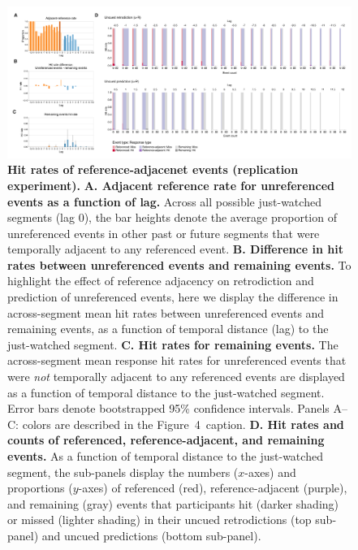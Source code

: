 \documentclass[10pt]{article}
\newcommand{\resultTwo}{4}
\begin{document}
\begin{figure}[tp]
    \centering
    \includegraphics[width=\textwidth]{results4_rep_ori}
      
        \caption{\textbf{Hit rates of reference-adjacenet events (replication experiment).} \textbf{A. Adjacent reference rate for unreferenced events as a function of lag.} Across all possible just-watched segments (lag 0), the bar heights denote the average proportion of unreferenced events in other past or future segments that were temporally adjacent to any referenced event. \textbf{B. Difference in hit rates between unreferenced events and remaining events.} To highlight the effect of reference adjacency on retrodiction and prediction of unreferenced events, here we display the difference in across-segment mean hit rates between unreferenced events and remaining events, as a function of temporal distance (lag) to the just-watched segment. \textbf{C. Hit rates for remaining events.} The across-segment mean response hit rates for unreferenced events that were \textit{not} temporally adjacent to any referenced events are displayed as a function of temporal distance to the just-watched segment. Error bars denote bootstrapped 95\% confidence intervals. Panels A--C: colors are described in the Figure~\resultTwo~caption. \textbf{D. Hit rates and counts of referenced, reference-adjacent, and remaining events.} As a function of temporal distance to the just-watched segment, the sub-panels display the numbers ($x$-axes) and proportions ($y$-axes) of referenced (red), reference-adjacent (purple), and remaining (gray) events that participants hit (darker shading) or missed (lighter shading) in their uncued retrodictions (top sub-panel) and uncued predictions (bottom sub-panel).}
        
    \label{fig:result4_rep_ori}
\end{figure}
\end{document}
